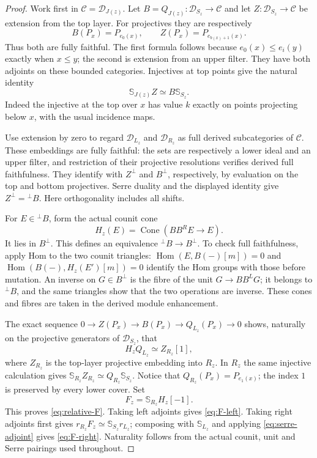 \documentclass[11pt]{article}
\theoremstyle{definition}
\newcommand{\Hom}{\operatorname{Hom}}
\begin{document}
\begin{proof}
Work first in $\mathcal C=\mathcal D_{J(z)}$.
Let $B=Q_{J(z)}:\mathcal D_{S_z}\to\mathcal C$ and let
$Z:\mathcal D_{S_z}\to\mathcal C$ be extension from the top layer.
For projectives they are respectively
\[
 B(P_x)=P_{e_0(x)},\qquad Z(P_x)=P_{e_{b(x)+1}(x)}.
\]
Thus both are fully faithful. The first formula follows because
$e_0(x)\leq e_i(y)$ exactly when $x\leq y$; the second is extension
from an upper filter. They have both adjoints on these bounded
categories. Injectives at top points give the natural identity
\[
 \mathbb S_{J(z)}Z\simeq B\mathbb S_{S_z}.
\]
Indeed the injective at the top over $x$ has value $k$ exactly on
points projecting below $x$, with the usual incidence maps.

Use extension by zero to regard $\mathcal D_{L_z}$ and
$\mathcal D_{R_z}$ as full derived subcategories of $\mathcal C$.
These embeddings are fully faithful: the sets are respectively a
lower ideal and an upper filter, and restriction of their
projective resolutions verifies derived full faithfulness.
They identify with $Z^\perp$ and $B^\perp$, respectively, by
evaluation on the top and bottom projectives. Serre duality and
the displayed identity give
$Z^\perp={}^\perp B$. Here orthogonality includes all shifts.

For $E\in{}^\perp B$, form the actual counit cone
\[
 H_z(E)=\operatorname{Cone}(B B^R E\longrightarrow E).
\]
It lies in $B^\perp$. This defines an equivalence
${}^\perp B\to B^\perp$. To check full faithfulness, apply Hom to
the two counit triangles: $\Hom(E,B(-)[m])=0$ and
$\Hom(B(-),H_z(E')[m])=0$ identify the Hom groups with those before
mutation. An inverse on $G\in B^\perp$ is the fibre of the unit
$G\to B B^L G$; it belongs to ${}^\perp B$, and the same triangles
show that the two operations are inverse. These cones and fibres
are taken in the derived module enhancement.

The exact sequence
$0\to Z(P_x)\to B(P_x)\to Q_{L_z}(P_x)\to0$
shows, naturally on the projective generators of $\mathcal D_{S_z}$,
that
\[
 H_z Q_{L_z}\simeq Z_{R_z}[1],
\]
where $Z_{R_z}$ is the top-layer projective embedding into $R_z$.
In $R_z$ the same injective calculation gives
$\mathbb S_{R_z}Z_{R_z}\simeq Q_{R_z}\mathbb S_{S_z}$.
Notice that $Q_{R_z}(P_x)=P_{e_1(x)}$; the index $1$ is preserved
by every lower cover. Set
\[
 F_z=\mathbb S_{R_z}H_z[-1].
\]
This proves \eqref{eq:relative-F}. Taking left adjoints gives
\eqref{eq:F-left}. Taking right adjoints first gives
$r_{R_z}F_z\simeq\mathbb S_{S_z}r_{L_z}$; composing with
$\mathbb S_{L_z}$ and applying \eqref{eq:serre-adjoint} gives
\eqref{eq:F-right}. Naturality follows from the actual counit,
unit and Serre pairings used throughout.
\end{proof}
\end{document}
